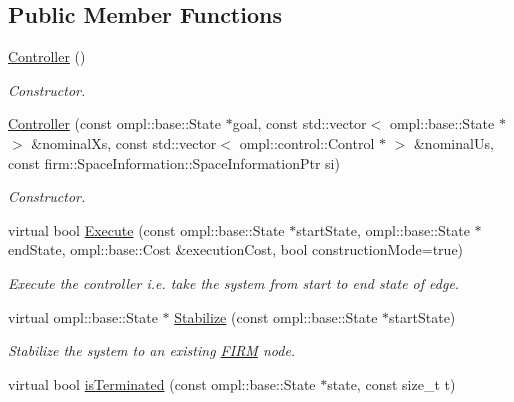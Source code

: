 \subsection*{\-Public \-Member \-Functions}
\begin{DoxyCompactItemize}
\item 
\hypertarget{class_controller_ab3f614e32fa25535809e056ce2492ab3}{\hyperlink{class_controller_ab3f614e32fa25535809e056ce2492ab3}{\-Controller} ()}\label{class_controller_ab3f614e32fa25535809e056ce2492ab3}

\begin{DoxyCompactList}\small\item\em \-Constructor. \end{DoxyCompactList}\item 
\hypertarget{class_controller_a50a65edd2cf9fcce0cca465cbc3d527d}{\hyperlink{class_controller_a50a65edd2cf9fcce0cca465cbc3d527d}{\-Controller} (const ompl\-::base\-::\-State $\ast$goal, const std\-::vector$<$ ompl\-::base\-::\-State $\ast$ $>$ \&nominal\-Xs, const std\-::vector$<$ ompl\-::control\-::\-Control $\ast$ $>$ \&nominal\-Us, const firm\-::\-Space\-Information\-::\-Space\-Information\-Ptr si)}\label{class_controller_a50a65edd2cf9fcce0cca465cbc3d527d}

\begin{DoxyCompactList}\small\item\em \-Constructor. \end{DoxyCompactList}\item 
virtual bool \hyperlink{class_controller_a01cbbc1435d0a4ed8733332bef6d7342}{\-Execute} (const ompl\-::base\-::\-State $\ast$start\-State, ompl\-::base\-::\-State $\ast$end\-State, ompl\-::base\-::\-Cost \&execution\-Cost, bool construction\-Mode=true)
\begin{DoxyCompactList}\small\item\em \-Execute the controller i.\-e. take the system from start to end state of edge. \end{DoxyCompactList}\item 
\hypertarget{class_controller_aba227cad46f73fab5fcf37b41cae71a9}{virtual ompl\-::base\-::\-State $\ast$ \hyperlink{class_controller_aba227cad46f73fab5fcf37b41cae71a9}{\-Stabilize} (const ompl\-::base\-::\-State $\ast$start\-State)}\label{class_controller_aba227cad46f73fab5fcf37b41cae71a9}

\begin{DoxyCompactList}\small\item\em \-Stabilize the system to an existing \hyperlink{class_f_i_r_m}{\-F\-I\-R\-M} node. \end{DoxyCompactList}\item 
\hypertarget{class_controller_ab80efffa3b03aa4d1d10c0bf82675201}{virtual bool \hyperlink{class_controller_ab80efffa3b03aa4d1d10c0bf82675201}{is\-Terminated} (const ompl\-::base\-::\-State $\ast$state, const size\-\_\-t t)}\label{class_controller_ab80efffa3b03aa4d1d10c0bf82675201}


\end{DoxyCompactItemize}
